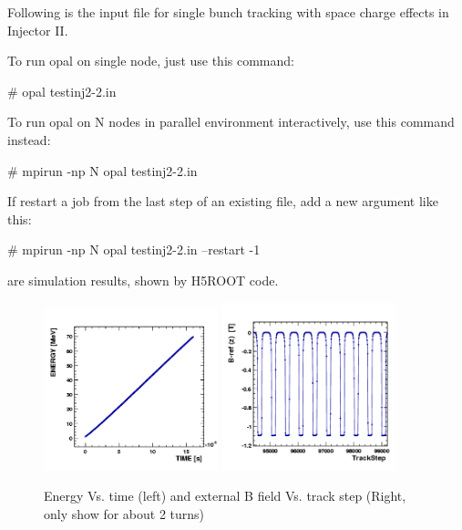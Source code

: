 Following is the input file for single bunch tracking with space charge effects in Injector II.


To run opal on single node, just use this command:
\begin{example}
 # opal testinj2-2.in
\end{example}

To run opal on N nodes in parallel environment interactively, use this command instead:
\begin{example}
 # mpirun -np N opal testinj2-2.in
\end{example}

If restart a job from the last step of an existing  file, add a new argument like this:
\begin{example}
 # mpirun -np N opal testinj2-2.in --restart -1
\end{example}
 are simulation results, shown by  H5ROOT code.

\begin{figure}[tb]
\centering
    \includegraphics[width=0.45\textwidth]{figures/cyclotron/Inj2-ENERGY-TIME.png}
    \includegraphics[width=0.45\textwidth]{figures/cyclotron/Inj2-B-ref-z-TrackStep.png}
    \caption{Energy Vs. time (left) and external B field Vs. track step (Right, only show for about 2 turns)}
    \label{fig:cyclParameters}
\end{figure}


